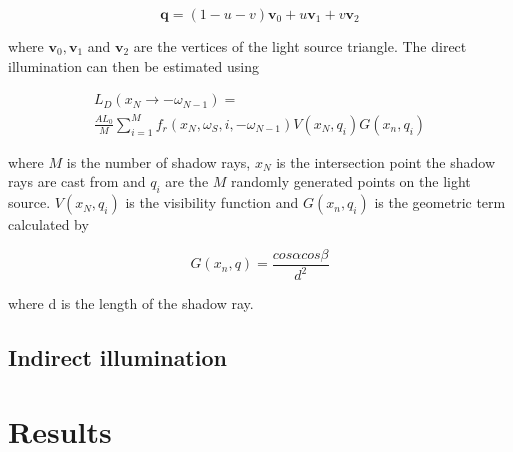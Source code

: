 \documentclass[twocolumn]{article}
\begin{document}
\begin{equation*}
	\mathbf{q} = (1 - u - v)\mathbf{v}_0 + u\mathbf{v}_1 + v\mathbf{v}_2
\end{equation*}

where $\mathbf{v}_0, \mathbf{v}_1$ and $\mathbf{v}_2$ are the vertices of the light source triangle. The direct illumination can then be estimated using

\begin{align*}
	L_D(x_N \rightarrow -\omega_{N-1}) = \\
	 \frac{AL_0}{M} \sum_{i=1}^{M}f_r(x_N, \omega_S, i, -\omega_{N-1})V(x_N, q_i)G(x_n, q_i)
\end{align*}

where $M$ is the number of shadow rays, $x_N$ is the intersection point the shadow rays are cast from and $q_i$ are the $M$ randomly generated points on the light source. $V(x_N, q_i)$ is the visibility function and $G(x_n, q_i)$ is the geometric term calculated by 

\begin{equation*}
	G(x_n, q) = \frac{cos\alpha cos\beta}{d^2}
\end{equation*}

where d is the length of the shadow ray.

\subsection{Indirect illumination}

\section{Results}


\newpage
\printbibliography
\end{document}
